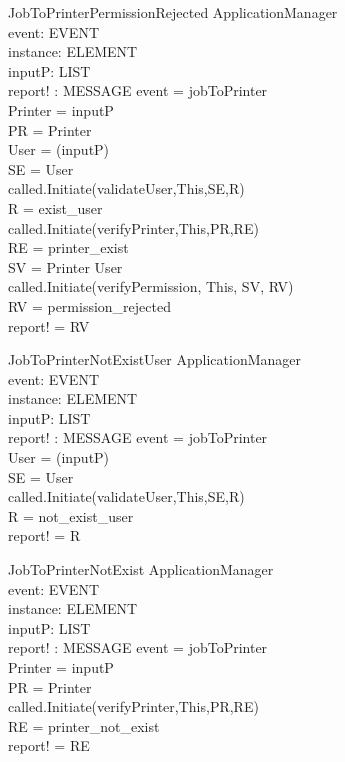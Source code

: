 \begin{schema}{JobToPrinterPermissionRejected}
\Delta ApplicationManager \\
event: EVENT \\
instance: ELEMENT \\
inputP: LIST \\
report! : MESSAGE
\where event = jobToPrinter \\
Printer = \head inputP \\
PR = \lseq Printer \rseq \\
User = \head (\tail inputP) \\
SE = \lseq User \rseq \\
called.Initiate(validateUser,This,SE,R) \\
R = exist\_user \\
called.Initiate(verifyPrinter,This,PR,RE) \\
RE = printer\_exist \\

SV = \lseq Printer User \rseq \\
called.Initiate(verifyPermission, This, SV, RV) \\
RV = permission\_rejected \\

report! = RV
\end{schema}

\begin{schema}{JobToPrinterNotExistUser}
\Delta ApplicationManager \\
event: EVENT \\
instance: ELEMENT \\
inputP: LIST \\
report! : MESSAGE
\where event = jobToPrinter \\
User = \head (\tail inputP) \\
SE = \lseq User \rseq \\
called.Initiate(validateUser,This,SE,R) \\
R = not\_exist\_user \\
report! = R
\end{schema}

\begin{schema}{JobToPrinterNotExist}
\Delta ApplicationManager \\
event: EVENT \\
instance: ELEMENT \\
inputP: LIST \\
report! : MESSAGE
\where event = jobToPrinter \\
Printer = \head inputP \\
PR = \lseq Printer \rseq \\
called.Initiate(verifyPrinter,This,PR,RE) \\
RE = printer\_not\_exist \\
report! = RE
\end{schema}






